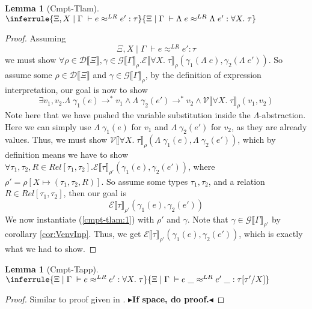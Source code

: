 \documentclass[twoside,11pt,openright]{report}
\newtheorem{lemma}[theorem]{Lemma}
\theoremstyle{definition}
\newcommand{\expr}{e}
\newcommand{\val}{v}
\newcommand{\Tvar}{X}
\newcommand{\Tlam}{\Lambda\;}
\newcommand{\Tapp}[1]{#1\;\_}
\newcommand{\subst}[3]{#1{\left[#3 \middle/ #2 \right]}}
\newcommand{\Tall}[2]{\forall #1.\; #2}
\newcommand{\typ}{\tau}
\newcommand{\venv}{\Gamma}
\newcommand{\tenv}{\Xi}
\newcommand{\jdgRel}[6]{#1 \; | \; #2 \; \vdash #3 \approx^{#4} #5 : #6}
\newcommand{\stepS}{\rightarrow^*}
\newcommand{\ValInp}[2]{\mathcal{V} \llbracket #1 \rrbracket_{#2}}
\newcommand{\ExpInp}[2]{\mathcal{E} \llbracket #1 \rrbracket_{#2}}
\newcommand{\VenvInp}[2]{\mathcal{G} \llbracket #1 \rrbracket_{#2}}
\newcommand{\TenvInp}[1]{\mathcal{D} \llbracket #1 \rrbracket}
\newcommand{\LogRel}[5]{\jdgRel{#1}{#2}{#3}{LR}{#4}{#5}}
\newcommand{\map}[2]{#1 \mapsto #2}
\newcommand{\todo}[1]{{\color[rgb]{.5,0,0}\textbf{$\blacktriangleright$#1$\blacktriangleleft$}}}
\begin{document}
\begin{lemma}[Cmpt-Tlam]
  $\inferrule
  { \LogRel{\tenv, \Tvar}{\venv}{\expr}{\expr'}{\typ} }
  { \LogRel{\tenv}{\venv}{\Tlam{\expr}}{\Tlam{\expr'}}{\Tall{\Tvar}{\typ}} }$
\end{lemma}
\begin{proof}
  Assuming
  \begin{equation}\label{cmpt-tlam:1}
    \LogRel{\tenv, \Tvar}{\venv}{\expr}{\expr'}{\typ}
  \end{equation}
  we must show
  $\forall \rho \in \TenvInp{\tenv}, \gamma \in \VenvInp{\venv}{\rho} . \ExpInp{\Tall{\Tvar}{\typ}}{\rho}(\gamma_1(\Tlam{\expr}), \gamma_2(\Tlam{\expr'}))$. So assume some $\rho \in \TenvInp{\tenv}$ and $\gamma \in \VenvInp{\venv}{\rho}$, by the definition of expression interpretation, our goal is now to show
  \begin{equation}
    \exists \val_1, \val_2 . \Tlam{\gamma_1(\expr)} \stepS \val_1 \land \Tlam{\gamma_2(\expr')} \stepS \val_2 \land \ValInp{\Tall{\Tvar}{\typ}}{\rho}(\val_1, \val_2)
  \end{equation}
  Note here that we have pushed the variable substitution inside the $\Lambda$-abstraction.
  Here we can simply use $\Tlam{\gamma_1(\expr)}$ for $\val_1$ and $\Tlam{\gamma_2(\expr')}$ for $\val_2$, as they are already values. Thus, we must show $\ValInp{\Tall{\Tvar}{\typ}}{\rho}(\Tlam{\gamma_1(\expr)}, \Tlam{\gamma_2(\expr')})$, which by definition means we have to show $\forall \typ_1, \typ_2, R \in Rel[\typ_1, \typ_2] . \ExpInp{\typ}{\rho'}(\gamma_1(\expr), \gamma_2(\expr'))$, where $\rho' = \rho[\map{\Tvar}{(\typ_1, \typ_2, R)}]$. So assume some types $\typ_1, \typ_2$, and a relation $R \in Rel[\typ_1, \typ_2]$, then our goal is
  \begin{equation}\label{cmpt-tlam:goal}
    \ExpInp{\typ}{\rho'}(\gamma_1(\expr), \gamma_2(\expr'))
  \end{equation}
  We now instantiate (\ref*{cmpt-tlam:1}) with $\rho'$ and $\gamma$. Note that $\gamma \in \VenvInp{\venv}{\rho'}$ by corollary \ref{cor:VenvInp}. Thus, we get $\ExpInp{\typ}{\rho'}(\gamma_1(\expr), \gamma_2(\expr'))$, which is exactly what we had to show.
\end{proof}


\begin{lemma}[Cmpt-Tapp]
  $\inferrule
  { \LogRel{\tenv}{\venv}{\expr}{\expr'}{\Tall{\Tvar}{\typ}} }
  { \LogRel{\tenv}{\venv}{\Tapp{\expr}}{\Tapp{\expr'}}{\subst{\typ}{\Tvar}{\typ'}} }$
\end{lemma}
\begin{proof}
  Similar to proof given in \cite{DBLP:journals/corr/abs-1907-11133}.
  \todo{If space, do proof.}
\end{proof}
\end{document}
